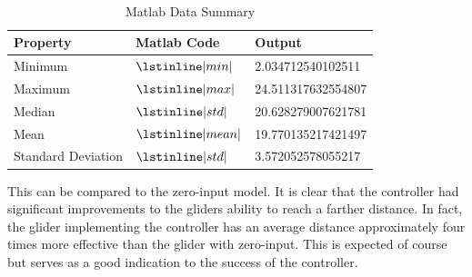 \documentclass[12pt]{article}
\begin{document}
\begin{table}[H]
\centering
\caption{Matlab Data Summary\label{table:1}} \\ 
\begin{tabular}{|p{4cm}|p{4cm}|p{4cm}|}
\hline
Property & Matlab Code & Output \\
\hline \hline
Minimum  & $\lstinline|min|$ & 2.034712540102511\\
Maximum &   $\lstinline|max|$ & 24.511317632554807\\
Median & $\lstinline|std|$ & 20.628279007621781\\ 
Mean    & $\lstinline|mean|$ & 19.770135217421497\\ 
Standard Deviation &   $\lstinline|std|$  & 3.572052578055217\\
\hline
\end{tabular}
\end{table}
This can be compared to the zero-input model. It is clear that the controller had significant improvements to the gliders ability to reach a farther distance. In fact, the glider implementing the controller has an average distance approximately four times more effective than the glider with zero-input. This is expected of course but serves as a good indication to the success of the controller.




\end{document}
